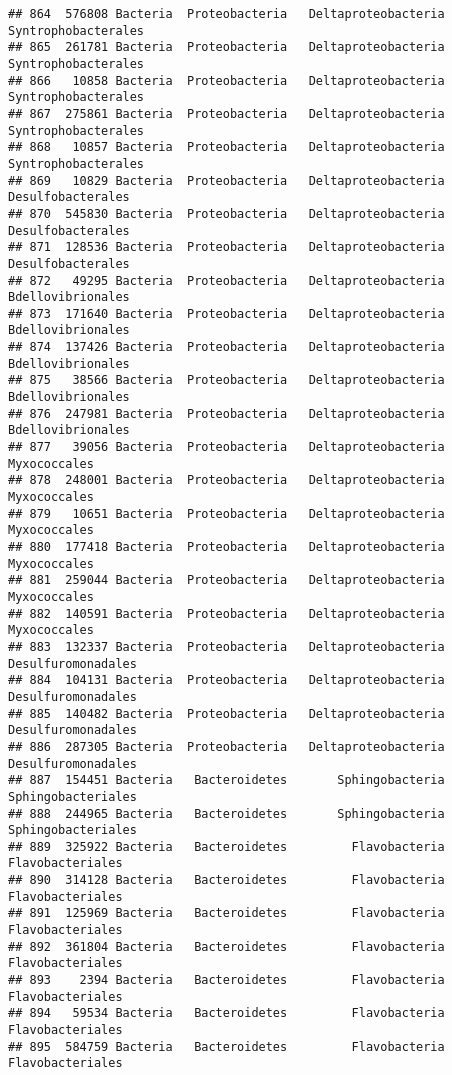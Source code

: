 \documentclass[
]{article}
\begin{document}
\begin{verbatim}
## 864  576808 Bacteria  Proteobacteria   Deltaproteobacteria Syntrophobacterales
## 865  261781 Bacteria  Proteobacteria   Deltaproteobacteria Syntrophobacterales
## 866   10858 Bacteria  Proteobacteria   Deltaproteobacteria Syntrophobacterales
## 867  275861 Bacteria  Proteobacteria   Deltaproteobacteria Syntrophobacterales
## 868   10857 Bacteria  Proteobacteria   Deltaproteobacteria Syntrophobacterales
## 869   10829 Bacteria  Proteobacteria   Deltaproteobacteria   Desulfobacterales
## 870  545830 Bacteria  Proteobacteria   Deltaproteobacteria   Desulfobacterales
## 871  128536 Bacteria  Proteobacteria   Deltaproteobacteria   Desulfobacterales
## 872   49295 Bacteria  Proteobacteria   Deltaproteobacteria   Bdellovibrionales
## 873  171640 Bacteria  Proteobacteria   Deltaproteobacteria   Bdellovibrionales
## 874  137426 Bacteria  Proteobacteria   Deltaproteobacteria   Bdellovibrionales
## 875   38566 Bacteria  Proteobacteria   Deltaproteobacteria   Bdellovibrionales
## 876  247981 Bacteria  Proteobacteria   Deltaproteobacteria   Bdellovibrionales
## 877   39056 Bacteria  Proteobacteria   Deltaproteobacteria        Myxococcales
## 878  248001 Bacteria  Proteobacteria   Deltaproteobacteria        Myxococcales
## 879   10651 Bacteria  Proteobacteria   Deltaproteobacteria        Myxococcales
## 880  177418 Bacteria  Proteobacteria   Deltaproteobacteria        Myxococcales
## 881  259044 Bacteria  Proteobacteria   Deltaproteobacteria        Myxococcales
## 882  140591 Bacteria  Proteobacteria   Deltaproteobacteria        Myxococcales
## 883  132337 Bacteria  Proteobacteria   Deltaproteobacteria  Desulfuromonadales
## 884  104131 Bacteria  Proteobacteria   Deltaproteobacteria  Desulfuromonadales
## 885  140482 Bacteria  Proteobacteria   Deltaproteobacteria  Desulfuromonadales
## 886  287305 Bacteria  Proteobacteria   Deltaproteobacteria  Desulfuromonadales
## 887  154451 Bacteria   Bacteroidetes       Sphingobacteria  Sphingobacteriales
## 888  244965 Bacteria   Bacteroidetes       Sphingobacteria  Sphingobacteriales
## 889  325922 Bacteria   Bacteroidetes         Flavobacteria    Flavobacteriales
## 890  314128 Bacteria   Bacteroidetes         Flavobacteria    Flavobacteriales
## 891  125969 Bacteria   Bacteroidetes         Flavobacteria    Flavobacteriales
## 892  361804 Bacteria   Bacteroidetes         Flavobacteria    Flavobacteriales
## 893    2394 Bacteria   Bacteroidetes         Flavobacteria    Flavobacteriales
## 894   59534 Bacteria   Bacteroidetes         Flavobacteria    Flavobacteriales
## 895  584759 Bacteria   Bacteroidetes         Flavobacteria    Flavobacteriales

\end{verbatim}
\end{document}
